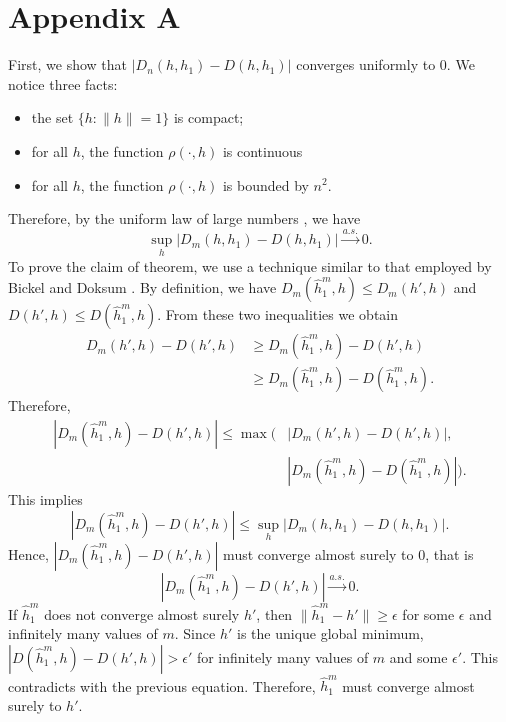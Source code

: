 \documentclass[10pt,journal,compsoc]{IEEEtran}
\newenvironment{proof}[1][Proof]{\begin{trivlist}
		\item[\hskip \labelsep {\bfseries #1}]}{\end{trivlist}}
\begin{document}
\section*{Appendix A}
\begin{proof} [Proof of Theorem 4.1]
First,  we show that $|D_n(h,h_1)-D(h,h_1)|$ converges uniformly to $0$.
We notice three facts:
\begin{itemize}
	\item[(1)] the set $\{h: \|h\|=1\}$ is compact;
	\item[(2)] for all $h$, the function $\rho(\cdot,h)$ is continuous
	\item[(3)] for all $h$, the function $\rho(\cdot,h)$ is bounded by $n^2$.
\end{itemize}
Therefore, by the uniform law of large numbers \cite{jennrich1969asymptotic}, we have
\[\underset{h}{\sup}|D_m(h,h_1)-D(h,h_1)|\overset{a.s.}{\rightarrow} 0.\]
To prove the claim of theorem, we use a technique similar to that employed by Bickel and Doksum \cite{bickel2015mathematical}. By definition, we have $D_m(\hat{h}_1^m,h)  \leq D_m(h',h)$ and $D(h',h) \leq D(\hat{h}_1^m,h)$. From these two inequalities we obtain
\begin{align*}
D_m(h',h)-D(h',h) &\geq D_m(\hat{h}_1^m,h)-D(h',h) \\
&\geq D_m(\hat{h}_1^m,h)-D(\hat{h}_1^m,h) .
\end{align*}
Therefore, 
\begin{align*}
|D_m(\hat{h}_1^m,h)-D(h',h)|  \leq  \max(&|D_m(h',h)-D(h',h)|,\\
& |D_m(\hat{h}_1^m,h)-D(\hat{h}_1^m,h)|).
\end{align*}
This implies 
\[ |D_m(\hat{h}_1^m,h)-D(h',h)| \leq \underset{h}{\sup}|D_m(h,h_1)-D(h,h_1)|. \]
Hence, $|D_m(\hat{h}_1^m,h)-D(h',h)|$ must converge almost surely to $0$, that is
\[|D_m(\hat{h}_1^m,h)-D(h',h)|\overset{a.s.}{\rightarrow} 0 .\]
 If $\hat{h}_1^m$ does not converge almost surely $h'$, then  $\|\hat{h}_1^m-h'\|\geq \epsilon$ for some $\epsilon$ and infinitely many values of $m$. Since $h'$ is the unique global minimum, $|D(\hat{h}_1^m,h)-D(h',h)| > \epsilon' $ for infinitely many values of $m$ and some $\epsilon' $. This contradicts with the previous equation. Therefore, $\hat{h}_1^m$ must converge almost surely to $h'$.
\end{proof}
\end{document}
